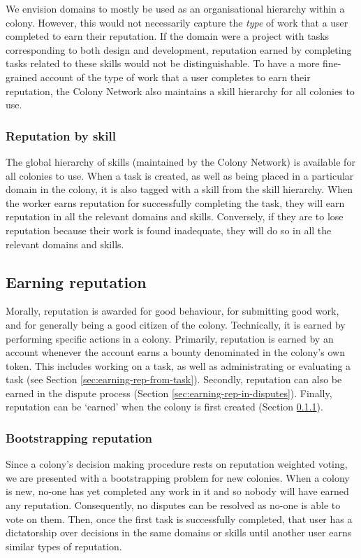 We envision domains to mostly be used as an organisational hierarchy within a colony. However, this would not necessarily capture the \emph{type} of work that a user completed to earn their reputation. If the domain were a project with tasks corresponding to both design and development, reputation earned by completing tasks related to these skills would not be distinguishable.  To have a more fine-grained account of the type of work that a user completes to earn their reputation, the Colony Network also maintains a skill hierarchy for all colonies to use.

\subsubsection{Reputation by skill}\label{sec:rep-by-skill}

The global hierarchy of skills (maintained by the Colony Network) is available for all colonies to use. When a task is created, as well as being placed in a particular domain in the colony, it is also tagged with a skill from the skill hierarchy. When the worker earns reputation for successfully completing the task, they will earn reputation in all the relevant domains and skills. Conversely, if they are to lose reputation because their work is found inadequate, they will do so in all the relevant domains and skills.

\subsection{Earning reputation}\label{sec:earning-rep}
Morally, reputation is awarded for good behaviour, for submitting good work, and for generally being a good citizen of the colony. Technically, it is earned by performing specific actions in a colony. Primarily, reputation is earned by an account whenever the account earns a bounty denominated in the colony's own token. This includes working on a task, as well as administrating or evaluating a task (see Section \ref{sec:earning-rep-from-task}). Secondly, reputation can also be earned in the dispute process (Section \ref{sec:earning-rep-in-disputes}). Finally, reputation can be `earned' when the colony is first created (Section \ref{sec:bootstrapping-rep}).

\subsubsection{Bootstrapping reputation}\label{sec:bootstrapping-rep}
Since a colony's decision making procedure rests on reputation weighted voting, we are presented with a bootstrapping problem for new colonies. When a colony is new, no-one has yet completed any work in it and so nobody will have earned any reputation. Consequently, no disputes can be resolved as no-one is able to vote on them. Then, once the first task is successfully completed, that user has a dictatorship over decisions in the same domains or skills until another user earns similar types of reputation.

